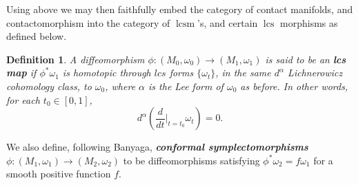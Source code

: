 \documentclass{amsart}
\numberwithin{equation}{section}
\newtheorem{definition}[equation]{Definition}
\theoremstyle{definition}
\theoremstyle{remark}
\DeclareMathOperator{\lcs}{lcs}
\DeclareMathOperator{\lcsm}{lcsm}
\begin{document}
Using above we may then  faithfully embed the category of contact manifolds, and contactomorphism  into the category of $\lcsm$'s, and certain $\lcs$ morphisms as defined below. 
\begin{definition} \label{definition:lcsmap}
   A diffeomorphism $\phi: (M _{0}, \omega _{0} ) \to (M _{1}, \omega _{1}  ) $ is said to be an \textbf{\emph{lcs map}} if $\phi ^{*} \omega _{1}  $ is homotopic through $lcs$ forms $\{\omega _{t} \}$, in the same $d ^{\alpha} $ Lichnerowicz cohomology class, to $\omega _{0} $, where $\alpha $ is the Lee form of $\omega _{0} $ as before. In other words, for each $t _{0}  \in [0,1]$, $$d ^{\alpha} (\frac{d}{dt} \vert _{t=t _{0}} \omega _{t}) = 0. $$
\end{definition}
We also define, following Banyaga,
\textbf{\emph{conformal symplectomorphisms}} $\phi: (M _{1} , \omega _{1} ) \to (M _{2}, \omega _{2}  )$ to be diffeomorphisms satisfying  $\phi ^{*} \omega _{2} = f \omega _{1} $ for a smooth positive function $f$.



\end{document}
